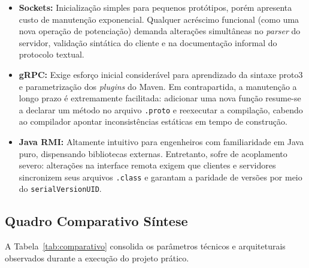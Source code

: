 \documentclass[12pt, a4paper]{article}
\begin{document}
\begin{itemize}
    \item \textbf{Sockets:} Inicialização simples para pequenos protótipos, porém apresenta custo de manutenção exponencial. Qualquer acréscimo funcional (como uma nova operação de potenciação) demanda alterações simultâneas no \textit{parser} do servidor, validação sintática do cliente e na documentação informal do protocolo textual.
    \item \textbf{gRPC:} Exige esforço inicial considerável para aprendizado da sintaxe proto3 e parametrização dos \textit{plugins} do Maven. Em contrapartida, a manutenção a longo prazo é extremamente facilitada: adicionar uma nova função resume-se a declarar um método no arquivo \texttt{.proto} e reexecutar a compilação, cabendo ao compilador apontar inconsistências estáticas em tempo de construção.
    \item \textbf{Java RMI:} Altamente intuitivo para engenheiros com familiaridade em Java puro, dispensando bibliotecas externas. Entretanto, sofre de acoplamento severo: alterações na interface remota exigem que clientes e servidores sincronizem seus arquivos \texttt{.class} e garantam a paridade de versões por meio do \texttt{serialVersionUID}.
\end{itemize}

\subsection{Quadro Comparativo Síntese}

A Tabela~\ref{tab:comparativo} consolida os parâmetros técnicos e arquiteturais observados durante a execução do projeto prático.
\end{document}
